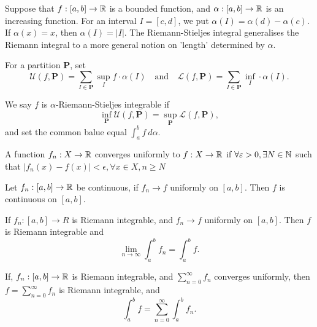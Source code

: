 \documentclass[twoside]{article}
\begin{document}
\begin{theorem}
	Suppose that $f : [a,b] \to \mathbb{R}$ is a bounded function, and $\alpha : [a,b] \to \mathbb{R}$ is an increasing function.
	For an interval $I = [c,d]$, we put $\alpha(I) = \alpha(d) - \alpha(c)$. If $\alpha(x) = x$, then
	$\alpha(I) = | I |$. The Riemann-Stieljes integral generalises the Riemann integral to a
	more general notion on 'length' determined by $\alpha$.

	For a partition $\bm{P}$, set
	\begin{equation*}
		\mathcal{U}(f, \bm{P}) = \sum_{I \in \bm{P}} \sup_{I} f \cdot \alpha(I) \quad \text{and} \quad
		\mathcal{L}(f, \bm{P}) = \sum_{I \in \bm{P}} \inf_{I} \cdot \alpha(I).
	\end{equation*}

	We say $f$ is $\alpha$-Riemann-Stieljes integrable if
	\begin{equation*}
		\inf_{\bm{P}}\mathcal{U}(f, \bm{P}) = \sup_{\bm{P}} \mathcal{L}(f, \bm{P}),
	\end{equation*}
	and set the common balue equal $\int_{a}^{b} f \ d \alpha$.
\end{theorem}

\begin{definition}
	A function $f_{n} : X \to \mathbb{R}$ converges uniformly to $f : X \to \mathbb{R}$ if
	$\forall \varepsilon > 0, \exists N \in \mathbb{N}$ such that $|f_{n}(x) - f(x) | < \epsilon , \forall x \in X, n \geq N$
\end{definition}

\begin{theorem}
	Let $f_{n} : [a, b] \to \mathbb{R}$ be continuous, if $f_{n} \to f$ uniformly on $[a,b]$.
	Then $f$ is continuous on $[a,b]$.
\end{theorem}

\begin{theorem}
	If $f_{n} : [a,b] \to R$ is Riemann integrable, and $f_{n} \to f$ uniformly on
	$[a,b]$. Then $f$ is Riemann integrable and
	\begin{equation*}
		\lim_{n \to \infty} \int_{a}^{b}f_{n} = \int_{a}^{b} f.
	\end{equation*}
\end{theorem}

\begin{corollary}
	If, $f_{n} : [a,b] \to \mathbb{R}$ is Riemann integrable, and $\sum_{n = 0}^{\infty} f_{n}$ converges uniformly,
	then $f = \sum_{n = 0}^{\infty} f_{n}$ is Riemann integrable, and
	\begin{equation*}
		\int_{a}^{b} f = \sum_{n = 0}^{\infty} \int_{a}^{b} f_{n}.
	\end{equation*}
\end{corollary}
\end{document}
